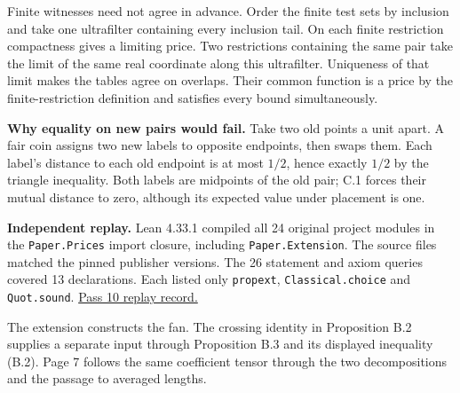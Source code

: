\documentclass[11pt,letterpaper]{article}
\newcommand{\subhead}[1]{\par\addvspace{7pt}{\large\bfseries\color{ink}#1\par}\nobreak}
\begin{document}
Finite witnesses need not agree in advance. Order the finite test sets by inclusion and take one ultrafilter containing every inclusion tail. On each finite restriction compactness gives a limiting price. Two restrictions containing the same pair take the limit of the same real coordinate along this ultrafilter. Uniqueness of that limit makes the tables agree on overlaps. Their common function is a price by the finite-restriction definition and satisfies every bound simultaneously.

\textbf{Why equality on new pairs would fail.} Take two old points a unit apart. A fair coin assigns two new labels to opposite endpoints, then swaps them. Each label's distance to each old endpoint is at most $1/2$, hence exactly $1/2$ by the triangle inequality. Both labels are midpoints of the old pair; C.1 forces their mutual distance to zero, although its expected value under placement is one.

\textbf{Independent replay.} Lean 4.33.1 compiled all 24 original project modules in the \texttt{Paper.Prices} import closure, including \texttt{Paper.Extension}. The source files matched the pinned publisher versions. The 26 statement and axiom queries covered 13 declarations. Each listed only \texttt{propext}, \texttt{Classical.choice} and \texttt{Quot.sound}. \href{https://github.com/nousentllc/VP-VNP-Review/blob/e66f5c5257493c2548903380bfc6a72fb0289c7b/checks/pass10_formal_results.json}{Pass 10 replay record.}

\subhead{The second geometric input}
The extension constructs the fan. The crossing identity in Proposition B.2 supplies a separate input through Proposition B.3 and its displayed inequality (B.2). Page 7 follows the same coefficient tensor through the two decompositions and the passage to averaged lengths.
\end{document}
